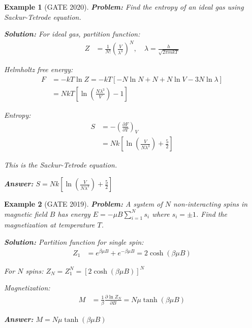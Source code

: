 \documentclass[12pt,a4paper]{article}
\newtheorem{example}{Example}[section]
\newcommand{\ans}[1]{\textcolor{red!70!black}{\textbf{Answer:} #1}}
\newcommand{\sol}{\textcolor{blue!70!black}{\textbf{Solution:}}}
\begin{document}
\begin{example}[GATE 2020]
\textbf{Problem:} Find the entropy of an ideal gas using Sackur-Tetrode equation.

\sol
For ideal gas, partition function:
\begin{align}
Z &= \frac{1}{N!}\left(\frac{V}{\lambda^3}\right)^N, \quad \lambda = \frac{h}{\sqrt{2\pi mkT}}
\end{align}

Helmholtz free energy:
\begin{align}
F &= -kT\ln Z = -kT\left[-N\ln N + N + N\ln V - 3N\ln\lambda\right]\\
&= NkT\left[\ln\left(\frac{N\lambda^3}{V}\right) - 1\right]
\end{align}

Entropy:
\begin{align}
S &= -\left(\frac{\partial F}{\partial T}\right)_V\\
&= Nk\left[\ln\left(\frac{V}{N\lambda^3}\right) + \frac{5}{2}\right]
\end{align}

This is the Sackur-Tetrode equation.

\ans{$S = Nk\left[\ln\left(\frac{V}{N\lambda^3}\right) + \frac{5}{2}\right]$}
\end{example}

\begin{example}[GATE 2019]
\textbf{Problem:} A system of $N$ non-interacting spins in magnetic field $B$ has energy $E = -\mu B\sum_{i=1}^N s_i$ where $s_i = \pm 1$. Find the magnetization at temperature $T$.

\sol
Partition function for single spin:
\begin{align}
Z_1 &= e^{\beta\mu B} + e^{-\beta\mu B} = 2\cosh(\beta\mu B)
\end{align}

For $N$ spins: $Z_N = Z_1^N = [2\cosh(\beta\mu B)]^N$

Magnetization:
\begin{align}
M &= \frac{1}{\beta}\frac{\partial \ln Z_N}{\partial B} = N\mu \tanh(\beta\mu B)
\end{align}

\ans{$M = N\mu \tanh(\beta\mu B)$}
\end{example}
\end{document}
